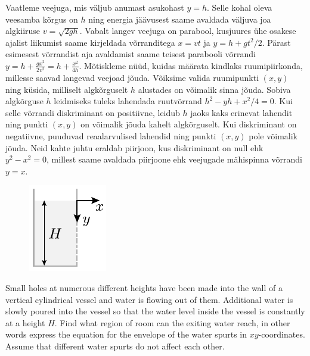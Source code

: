{\ifSolution
Vaatleme veejuga, mis väljub anumast asukohast $y=h$. Selle kohal oleva veesamba kõrgus on $h$ ning energia jäävusest saame avaldada väljuva joa algkiiruse $v=\sqrt{2gh}$. Vabalt langev veejuga on parabool, kusjuures ühe osakese ajalist liikumist saame kirjeldada võrranditega $x=vt$ ja $y=h+gt^2/2$. Pärast esimesest võrrandist aja avaldamist saame teisest parabooli võrrandi $y = h + \frac{gx^2}{2v^2} = h + \frac{x^2}{4h}$. Mõtiskleme nüüd, kuidas määrata kindlaks ruumipiirkonda, millesse saavad langevad veejoad jõuda. Võiksime valida ruumipunkti $(x,y)$ ning küsida, milliselt algkõrguselt $h$ alustades on võimalik sinna jõuda. Sobiva algkõrguse $h$ leidmiseks tuleks lahendada ruutvõrrand $h^2 - yh + x^2/4 = 0$. Kui selle võrrandi diskriminant on positiivne, leidub $h$ jaoks kaks erinevat lahendit ning punkti $(x,y)$ on võimalik jõuda kahelt algkõrguselt. Kui diskriminant on negatiivne, puuduvad reaalarvulised lahendid ning punkti $(x,y)$ pole võimalik jõuda. Neid kahte juhtu eraldab piirjoon, kus diskriminant on null ehk $y^2 - x^2=0$, millest saame avaldada piirjoone ehk veejugade mähispinna võrrandi $y=x$.
\fi


\ifEngStatement
\begin{figure}%
\vspace{-15pt}
\includegraphics[width=\linewidth]{2015-lahg-07-veejoadJoon}%
\end{figure}
Small holes at numerous different heights have been made into the wall of a vertical cylindrical vessel and water is flowing out of them. Additional water is slowly poured into the vessel so that the water level inside the vessel is constantly at a height $H$. Find what region of room can the exiting water reach, in other words express the equation for the envelope of the water spurts in $xy$-coordinates. Assume that different water spurts do not affect each other.
\fi


}
